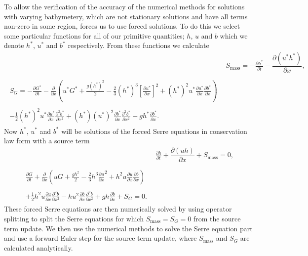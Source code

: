 To allow the verification of the accuracy of the numerical methods for solutions with varying bathymetery, which are not stationary solutions and have all terms non-zero in some region, forces us to use forced solutions. To do this we select some particular functions for all of our primitive quantities; $h$, $u$ and $b$ which we denote $h^*$, $u^*$ and $b^*$ respectively. From these functions we calculate 
\begin{align*}
&  S_{\text{mass}} = -\frac{\partial h^*}{\partial t} - \dfrac{\partial (u^*h^*)}{\partial x} ,  \\ \nonumber \\
\begin{split}
S_{G} = -\frac{\partial G^*}{\partial t}  - \frac{\partial}{\partial x} \left( {u}^* G^* + \frac{g\left(h^*\right)^2}{2} - \frac{2}{3}\left(h^*\right)^3 \left[\frac{\partial {u}^*}{\partial x}\right]^2 + \left(h^*\right)^2 {u^*}\frac{\partial {u}^*}{\partial x}\frac{\partial b^*}{\partial x} \right) \\ \\ - \frac{1}{2}\left(h^*\right)^2 {u}^* \frac{\partial {u}^*}{\partial x} \frac{\partial^2 b^*}{\partial x^2}  + \left(h^*\right) {\left(u^*\right)}^2\frac{\partial b^*}{\partial x}\frac{\partial^2 b^*}{\partial x^2} - gh^*\frac{\partial b^*}{\partial x}.
\end{split}
\end{align*} 
Now  $h^*$, $u^*$ and $b^*$ will be solutions of the forced Serre equations in conservation law form with a source term
\begin{subequations}
	\label{eqn:FullSerreConForced}
	\begin{align}
	& \frac{\partial h}{\partial t} + \dfrac{\partial (uh)}{\partial x} + S_{\text{mass}}  = 0 ,\label{eqn:FullSerreConMassForced}  \\ \nonumber \\
	\begin{split}
	\label{eqn:SerreconsconmomForced}
	\frac{\partial G}{\partial t}  + \frac{\partial}{\partial x} \left( {u} G + \frac{gh^2}{2} - \frac{2}{3}h^3 \frac{\partial {u}}{\partial x}^2 + h^2 {u}\frac{\partial {u}}{\partial x}\frac{\partial b}{\partial x} \right) \\ \\ + \frac{1}{2}h^2 {u} \frac{\partial {u}}{\partial x} \frac{\partial^2 b}{\partial x^2}  - h {u}^2\frac{\partial b}{\partial x}\frac{\partial^2 b}{\partial x^2} + gh\frac{\partial b}{\partial x} + S_{G} = 0.
	\end{split}
	\end{align}
\end{subequations}
These forced Serre equations are then numerically solved by using operator splitting to split the Serre equations for which $S_{\text{mass}} = S_{G} = 0$ from the source term update. We then use the numerical methods to solve the Serre equation part and use a forward Euler step for the source term update, where $S_{\text{mass}}$ and $S_{G}$ are calculated analytically. 

